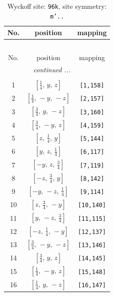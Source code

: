 \documentclass[fleqn,8pt]{jsarticle}
\begin{document}
\begin{longtable}{ccc}
\caption{Wyckoff site: {\tt 96k}, site symmetry: {\tt m'..}}
 \\
 \hline \hline
No. & position & mapping \\ \hline \endfirsthead

\multicolumn{2}{l}{\tablename\ \thetable{}} \\
 \hline \hline
No. & position & mapping \\ \hline \endhead

 \hline \hline
\multicolumn{2}{r}{\footnotesize\it continued ...} \\ \endfoot

 \hline \hline
\multicolumn{2}{r}{} \\ \endlastfoot

1 & $\left[ \frac{1}{4},\, y,\, z \right]$ & {\tt [1,158]} \\ \hline
2 & $\left[ \frac{1}{4},\, - y,\, - z \right]$ & {\tt [2,157]} \\ \hline
3 & $\left[ \frac{3}{4},\, y,\, - z \right]$ & {\tt [3,160]} \\ \hline
4 & $\left[ \frac{3}{4},\, - y,\, z \right]$ & {\tt [4,159]} \\ \hline
5 & $\left[ z,\, \frac{1}{4},\, y \right]$ & {\tt [5,144]} \\ \hline
6 & $\left[ y,\, z,\, \frac{1}{4} \right]$ & {\tt [6,117]} \\ \hline
7 & $\left[ - y,\, z,\, \frac{3}{4} \right]$ & {\tt [7,119]} \\ \hline
8 & $\left[ - z,\, \frac{3}{4},\, y \right]$ & {\tt [8,142]} \\ \hline
9 & $\left[ - y,\, - z,\, \frac{1}{4} \right]$ & {\tt [9,114]} \\ \hline
10 & $\left[ z,\, \frac{3}{4},\, - y \right]$ & {\tt [10,140]} \\ \hline
11 & $\left[ y,\, - z,\, \frac{3}{4} \right]$ & {\tt [11,115]} \\ \hline
12 & $\left[ - z,\, \frac{1}{4},\, - y \right]$ & {\tt [12,137]} \\ \hline
13 & $\left[ \frac{3}{4},\, - y,\, - z \right]$ & {\tt [13,146]} \\ \hline
14 & $\left[ \frac{3}{4},\, y,\, z \right]$ & {\tt [14,145]} \\ \hline
15 & $\left[ \frac{1}{4},\, - y,\, z \right]$ & {\tt [15,148]} \\ \hline
16 & $\left[ \frac{1}{4},\, y,\, - z \right]$ & {\tt [16,147]} \\ \hline

\end{longtable}
\end{document}
